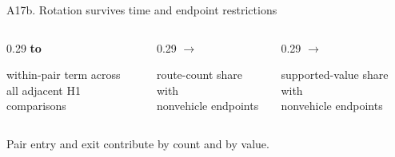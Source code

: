 \begin{frame}{A17b. Rotation survives time and endpoint restrictions}
\vspace{0.18cm}
\begin{columns}[T,totalwidth=0.92\textwidth]
\begin{column}{0.29\textwidth}
\centering
{\fontsize{18}{20}\selectfont\bfseries\color{ucldark}\AdjacentWithinMin{} to\\[-0.03cm] \AdjacentWithinMax}\par
{\small within-pair term across\\all adjacent H1 comparisons\par}
\end{column}
\hfill
\begin{column}{0.29\textwidth}
\centering
{\fontsize{19}{21}\selectfont\bfseries\color{stable}\NonvehicleEndpointStableBase{} $\rightarrow$\\[-0.03cm] \NonvehicleEndpointStableEnd}\par
{\small route-count share with\\nonvehicle endpoints\par}
\end{column}
\hfill
\begin{column}{0.29\textwidth}
\centering
{\fontsize{19}{21}\selectfont\bfseries\color{stable}\NonvehicleEndpointValueBase{} $\rightarrow$\\[-0.03cm] \NonvehicleEndpointValueEnd}\par
{\small supported-value share with\\nonvehicle endpoints\par}
\end{column}
\end{columns}
\vspace{0.62cm}
{\large Pair entry and exit contribute \NonvehicleEndpointCountExclusive{} by count and \NonvehicleEndpointValueExclusive{} by value.\par}
\end{frame}

